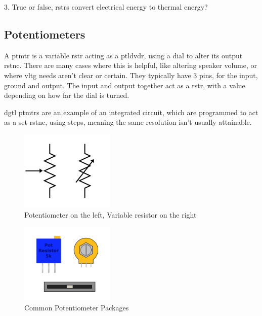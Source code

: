 \documentclass[a4paper,11pt]{report}
\begin{document}
3. True or false, \gls{rstr}s convert electrical energy to thermal energy?

\vspace*{1\baselineskip}

\subsection{Potentiometers}

A \gls{ptmtr} is a variable \gls{rstr} acting as a \gls{ptldvdr}, using a dial to alter its output \gls{rstnc}. There are many cases where this is helpful, like altering speaker volume, or where \gls{vltg} needs aren't clear or certain. They typically have 3 pins, for the input, ground and output. The input and output together act as a \gls{rstr}, with a value depending on how far the dial is turned.

\gls{dgtl} \gls{ptmtr}s are an example of an integrated circuit, which are programmed to act as a set \gls{rstnc}, using steps, meaning the same resolution isn't usually attainable.

\begin{figure}[H]
\centering
\includegraphics[width=0.4\textwidth]{Potentiometer1}
\caption{Potentiometer on the left, Variable resistor on the right}
\end{figure}

\begin{figure}[H]
\centering
\includegraphics[width=0.4\textwidth]{PotentiometerPackages}
\caption{Common Potentiometer Packages}
\end{figure}
\end{document}

